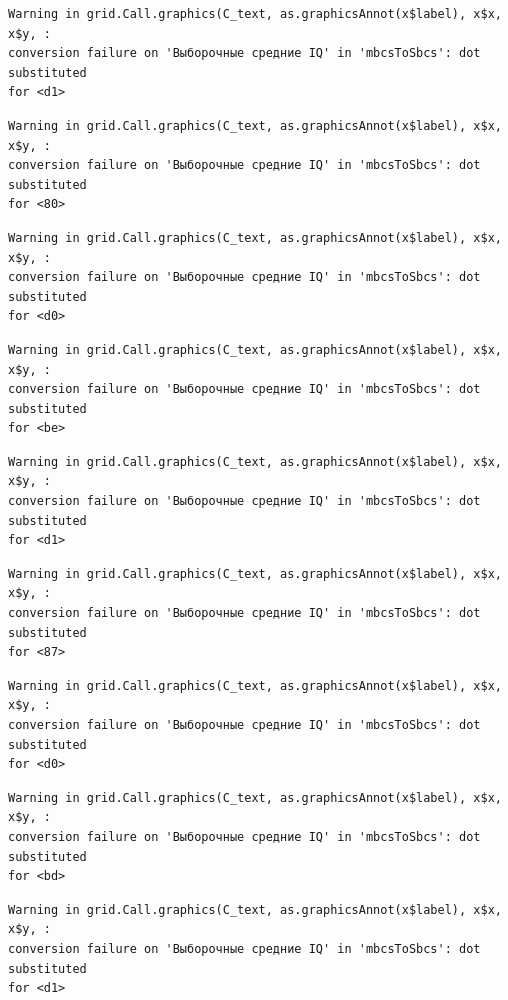\documentclass[
  letterpaper,
  DIV=11,
  numbers=noendperiod]{scrreprt}
\theoremstyle{definition}
\theoremstyle{remark}
\begin{document}
\begin{verbatim}
Warning in grid.Call.graphics(C_text, as.graphicsAnnot(x$label), x$x, x$y, :
conversion failure on 'Выборочные средние IQ' in 'mbcsToSbcs': dot substituted
for <d1>
\end{verbatim}

\begin{verbatim}
Warning in grid.Call.graphics(C_text, as.graphicsAnnot(x$label), x$x, x$y, :
conversion failure on 'Выборочные средние IQ' in 'mbcsToSbcs': dot substituted
for <80>
\end{verbatim}

\begin{verbatim}
Warning in grid.Call.graphics(C_text, as.graphicsAnnot(x$label), x$x, x$y, :
conversion failure on 'Выборочные средние IQ' in 'mbcsToSbcs': dot substituted
for <d0>
\end{verbatim}

\begin{verbatim}
Warning in grid.Call.graphics(C_text, as.graphicsAnnot(x$label), x$x, x$y, :
conversion failure on 'Выборочные средние IQ' in 'mbcsToSbcs': dot substituted
for <be>
\end{verbatim}

\begin{verbatim}
Warning in grid.Call.graphics(C_text, as.graphicsAnnot(x$label), x$x, x$y, :
conversion failure on 'Выборочные средние IQ' in 'mbcsToSbcs': dot substituted
for <d1>
\end{verbatim}

\begin{verbatim}
Warning in grid.Call.graphics(C_text, as.graphicsAnnot(x$label), x$x, x$y, :
conversion failure on 'Выборочные средние IQ' in 'mbcsToSbcs': dot substituted
for <87>
\end{verbatim}

\begin{verbatim}
Warning in grid.Call.graphics(C_text, as.graphicsAnnot(x$label), x$x, x$y, :
conversion failure on 'Выборочные средние IQ' in 'mbcsToSbcs': dot substituted
for <d0>
\end{verbatim}

\begin{verbatim}
Warning in grid.Call.graphics(C_text, as.graphicsAnnot(x$label), x$x, x$y, :
conversion failure on 'Выборочные средние IQ' in 'mbcsToSbcs': dot substituted
for <bd>
\end{verbatim}

\begin{verbatim}
Warning in grid.Call.graphics(C_text, as.graphicsAnnot(x$label), x$x, x$y, :
conversion failure on 'Выборочные средние IQ' in 'mbcsToSbcs': dot substituted
for <d1>
\end{verbatim}
\end{document}
